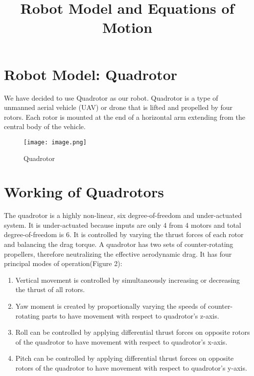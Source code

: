 \documentclass{article}
\title{\textbf{Robot Model and Equations of Motion}}
\begin{document}
\maketitle


\section{Robot Model: Quadrotor}

We have decided to use Quadrotor as our robot. Quadrotor is a type of unmanned aerial vehicle (UAV) or drone that is lifted and propelled by four rotors. Each rotor is mounted at the end of a horizontal arm extending from the central body of the vehicle. 

\begin{figure}[H]
\centering
\texttt{[image: image.png]}
\caption{\label{fig:Quadrotor}Quadrotor}
\end{figure}


\section{Working of Quadrotors}

The quadrotor is a highly non-linear, six degree-of-freedom and under-actuated system. It is under-actuated because inputs are only 4 from 4 motors and total degree-of-freedom is 6. It is controlled by varying the thrust forces of each rotor and balancing the drag torque. A quadrotor has two sets of counter-rotating propellers, therefore neutralizing the effective aerodynamic drag. It has four principal modes of operation(Figure 2): 
\begin{enumerate}
\item Vertical movement is controlled by simultaneously increasing or decreasing the thrust of all rotors.
\item Yaw moment is created by proportionally varying the speeds of counter-rotating parts to have movement with respect to quadrotor's z-axis.
\item Roll can be controlled by applying differential thrust forces on opposite rotors of the quadrotor to have movement with respect to quadrotor's x-axis.
\item Pitch can be controlled by applying differential thrust forces on opposite rotors of the quadrotor to have movement with respect to quadrotor's y-axis.
\end{enumerate}
\end{document}
